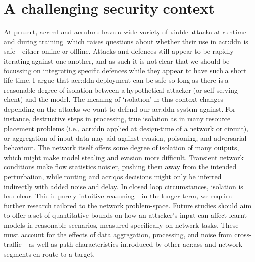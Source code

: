\section{A challenging security context}
At present, \gls{acr:ml} and \glspl{acr:dnn} have a wide variety of viable attacks at runtime and during training, which raises questions about whether their use in \gls{acr:ddn} is safe---either online or offline.
Attacks and defences still appear to be rapidly iterating against one another, and as such it is not clear that we should be focussing on integrating specific defences while they appear to have such a short life-time.
I argue that \gls{acr:ddn} deployment can be safe so long as there is a reasonable degree of isolation between a hypothetical attacker (or self-serving client) and the model.
The meaning of `isolation' in this context changes depending on the attacks we want to defend our \gls{acr:ddn} system against.
For instance, destructive steps in processing, true isolation as in many resource placement problems (i.e., \gls{acr:ddn} applied at design-time of a network or circuit), or aggregation of input data may aid against evasion, poisoning, and adversarial behaviour.
The network itself offers some degree of isolation of many outputs, which might make model stealing and evasion more difficult.
Transient network conditions make flow statistics noisier, pushing them away from the intended perturbation, while routing and \gls{acr:qos} decisions might only be inferred indirectly with added noise and delay.
In closed loop circumstances, isolation is less clear.
This is purely intuitive reasoning---in the longer term, we require further research tailored to the network problem-space.
Future studies should aim to offer a set of quantitative bounds on how an attacker's input can affect learnt models in reasonable scenarios, measured specifically on network tasks.
These must account for the effects of data aggregation, processing, and noise from cross-traffic---as well as path characteristics introduced by other \glspl{acr:as} and network segments en-route to a target.

